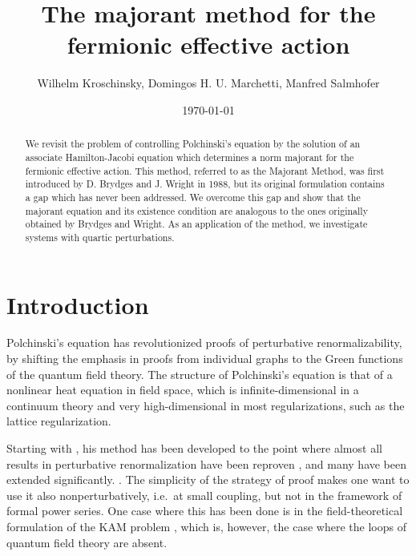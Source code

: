 \documentclass[12pt,twoside]{amsart}
\numberwithin{equation}{section}
\begin{document}
\title[]{The majorant method for the fermionic effective action}
\author{Wilhelm Kroschinsky, Domingos H. U. Marchetti, Manfred Salmhofer} 
\address{
Institute for Applied Mathematics, Hausdorff-Center for Mathematics, University of Bonn, Endenicher Allee 60, 53115 Bonn, Germany
 --- %
Instituto de F\' isica, Universidade de São Paulo, Brazil
 --- %
Institut f\" ur Theoretische Physik, Universit\" at Heidelberg,
Philosophenweg~19, 69120 Heidelberg, Germany}


\date{\today}

\begin{abstract}
\noindent
We revisit the problem of controlling Polchinski's equation by the solution of an associate Hamilton-Jacobi equation which determines a norm majorant for the fermionic effective action. This method, referred to as the Majorant Method, was first introduced by D. Brydges and J. Wright in 1988, but its original formulation contains a gap which has never been addressed. We overcome this gap and show that the majorant equation and its existence condition are analogous to the ones originally obtained by Brydges and Wright. As an application of the method, we investigate systems with quartic perturbations. %
\end{abstract}

\maketitle

\section{Introduction}

Polchinski's equation \cite{Polch} has revolutionized proofs of perturbative renormalizability, by shifting the emphasis in proofs from individual graphs to the Green functions of the quantum field theory. The structure of Polchinski's equation is that of a nonlinear heat equation in field space, which is infinite-dimensional in a continuum theory and very high-dimensional in most regularizations, such as the lattice regularization. 

Starting with \cite{KKS}, his method has been developed to the point where almost all results in perturbative renormalization have been reproven \cite{KeKoQED,KeKoZi,KoMue}, and many have been extended significantly. \cite{HoHo,KoHoOPE,HoStM,Sa98,MSbook}. 
The simplicity of the strategy of proof makes one want to use it also nonperturbatively, i.e.\ at small coupling, but not in the framework of formal power series. One case where this has been done is in the field-theoretical formulation of the KAM problem \cite{DeSiKupi}, which is, however, the case where the loops of quantum field theory are absent. 
\end{document}

